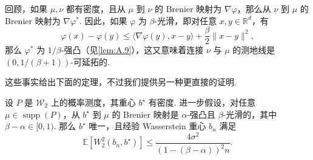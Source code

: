 回顾，如果 $\mu,\nu$ 都有密度，且从 $\mu$ 到 $\nu$ 的 Brenier 映射为 $\nabla\varphi$，那么从 $\nu$ 到 $\mu$ 的 Brenier 映射为 $\nabla\varphi^*$. 因此，如果 $\varphi$ 为 $\beta$-光滑，即对任意 $x,y\in\mathbb R^d$，有
$$\varphi(x)-\varphi(y)\le\langle\nabla\varphi(y),x-y\rangle+\frac\beta2\|x-y\|^2,$$
那么 $\varphi^*$ 为 $1/\beta$-强凸（见\autoref{lem:A.9}），这又意味着连接 $\nu$ 与 $\mu$ 的测地线是 $(0,1/(\beta+1))$-可延拓的.

这些事实给出下面的定理，不过我们提供另一种更直接的证明.
\begin{theorem}\label{thm:8.11}
设 $P$ 是 $\mathcal W_2$ 上的概率测度，其重心 $b^\star$ 有密度. 进一步假设，对任意 $\mu\in\operatorname{supp}(P)$，从 $b^\star$ 到 $\mu$ 的 Brenier 映射是 $\alpha$-强凸且 $\beta$-光滑的，其中 $\beta-\alpha\in[0,1)$. 那么 $b^\star$ 唯一，且经验 Wasserstein 重心 $b_n$ 满足
$$\mathbb E[W_2^2(b_n,b^\star)]\le\frac{4\sigma^2}{(1-(\beta-\alpha))^2n}.$$
\end{theorem}
